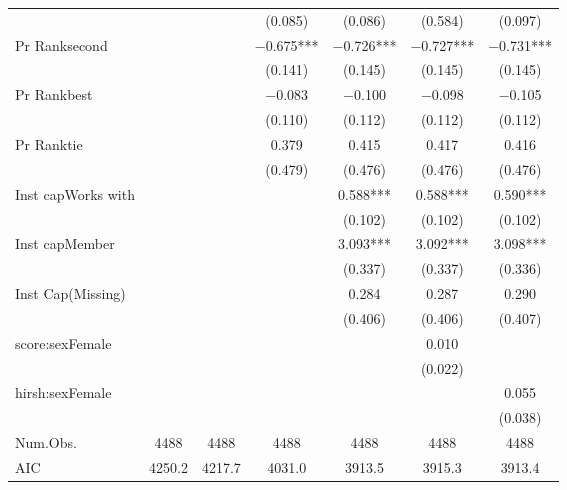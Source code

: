 \begin{table}
\begin{tabular}[t]{lcccccc}
 &  &  & (\num{0.085}) & (\num{0.086}) & (\num{0.584}) & (\num{0.097})\\
Pr Ranksecond &  &  & \num{-0.675}*** & \num{-0.726}*** & \num{-0.727}*** & \num{-0.731}***\\
 &  &  & (\num{0.141}) & (\num{0.145}) & (\num{0.145}) & (\num{0.145})\\
Pr Rankbest &  &  & \num{-0.083} & \num{-0.100} & \num{-0.098} & \num{-0.105}\\
 &  &  & (\num{0.110}) & (\num{0.112}) & (\num{0.112}) & (\num{0.112})\\
Pr Ranktie &  &  & \num{0.379} & \num{0.415} & \num{0.417} & \num{0.416}\\
 &  &  & (\num{0.479}) & (\num{0.476}) & (\num{0.476}) & (\num{0.476})\\
Inst capWorks with &  &  &  & \num{0.588}*** & \num{0.588}*** & \num{0.590}***\\
 &  &  &  & (\num{0.102}) & (\num{0.102}) & (\num{0.102})\\
Inst capMember &  &  &  & \num{3.093}*** & \num{3.092}*** & \num{3.098}***\\
 &  &  &  & (\num{0.337}) & (\num{0.337}) & (\num{0.336})\\
Inst Cap(Missing) &  &  &  & \num{0.284} & \num{0.287} & \num{0.290}\\
 &  &  &  & (\num{0.406}) & (\num{0.406}) & (\num{0.407})\\
score:sexFemale &  &  &  &  & \num{0.010} & \\
 &  &  &  &  & (\num{0.022}) & \\
hirsh:sexFemale &  &  &  &  &  & \num{0.055}\\
 &  &  &  &  &  & (\num{0.038})\\
\midrule
Num.Obs. & \num{4488} & \num{4488} & \num{4488} & \num{4488} & \num{4488} & \num{4488}\\
AIC & \num{4250.2} & \num{4217.7} & \num{4031.0} & \num{3913.5} & \num{3915.3} & \num{3913.4}\\
\bottomrule
\end{tabular}
\end{table}
